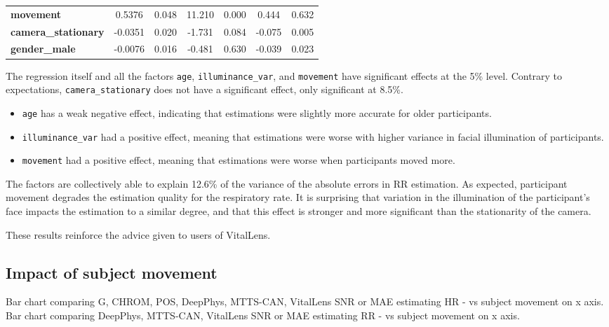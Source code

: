 \documentclass{article}
\begin{document}
\begin{table}[h!]
\begin{center}
\begin{tabular}{lcccccc}
\textbf{movement}                &       0.5376  &        0.048     &    11.210  &         0.000        &        0.444    &        0.632     \\
\textbf{camera\_stationary}      &      -0.0351  &        0.020     &    -1.731  &         0.084        &       -0.075    &        0.005     \\
\textbf{gender\_male}            &      -0.0076  &        0.016     &    -0.481  &         0.630        &       -0.039    &        0.023     \\
\bottomrule
\end{tabular}
\end{center}
\end{table}

The regression itself and all the factors \texttt{age}, \texttt{illuminance\_var}, and \texttt{movement} have significant effects at the 5\% level.
Contrary to expectations, \texttt{camera\_stationary} does not have a significant effect, only significant at 8.5\%.

\begin{itemize}
	\item \texttt{age} has a weak negative effect, indicating that estimations were slightly more accurate for older participants.
	\item \texttt{illuminance\_var} had a positive effect, meaning that estimations were worse with higher variance in facial illumination of participants.
	\item \texttt{movement} had a positive effect, meaning that estimations were worse when participants moved more.
\end{itemize}

The factors are collectively able to explain 12.6\% of the variance of the absolute errors in RR estimation.
As expected, participant movement degrades the estimation quality for the respiratory rate.
It is surprising that variation in the illumination of the participant's face impacts the estimation to a similar degree, and that this effect is stronger and more significant than the stationarity of the camera.

These results reinforce the advice given to users of VitalLens.

\subsection{Impact of subject movement}

Bar chart comparing G, CHROM, POS, DeepPhys, MTTS-CAN, VitalLens SNR or MAE estimating HR - vs subject movement on x axis.
Bar chart comparing DeepPhys, MTTS-CAN, VitalLens SNR or MAE estimating RR - vs subject movement on x axis.
\end{document}
